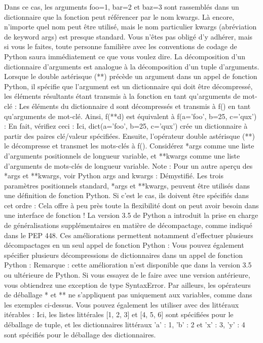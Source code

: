 Dans ce cas, les arguments foo=1, bar=2 et baz=3 sont rassemblés dans un dictionnaire que la fonction peut référencer par le nom kwargs.  Là encore, n'importe quel nom peut être utilisé, mais le nom particulier kwargs (abréviation de keyword args) est presque standard.  Vous n'êtes pas obligé d'y adhérer, mais si vous le faites, toute personne familière avec les conventions de codage de Python saura immédiatement ce que vous voulez dire.
La décomposition d'un dictionnaire d'arguments est analogue à la décomposition d'un tuple d'arguments.  Lorsque le double astérisque (**) précède un argument dans un appel de fonction Python, il spécifie que l'argument est un dictionnaire qui doit être décompressé, les éléments résultants étant transmis à la fonction en tant qu'arguments de mot-clé :
Les éléments du dictionnaire d sont décompressés et transmis à f() en tant qu'arguments de mot-clé.  Ainsi, f(**d) est équivalent à f(a='foo', b=25, c='qux') :
En fait, vérifiez ceci :
Ici, dict(a='foo', b=25, c='qux') crée un dictionnaire à partir des paires clé/valeur spécifiées.  Ensuite, l'opérateur double astérisque (**) le décompresse et transmet les mots-clés à f().
Considérez *args comme une liste d'arguments positionnels de longueur variable, et **kwargs comme une liste d'arguments de mots-clés de longueur variable.
Note : Pour un autre aperçu des *args et **kwargs, voir Python args and kwargs : Démystifié.
Les trois paramètres positionnels standard, *args et **kwargs, peuvent être utilisés dans une définition de fonction Python. Si c'est le cas, ils doivent être spécifiés dans cet ordre :
Cela offre à peu près toute la flexibilité dont on peut avoir besoin dans une interface de fonction !
La version 3.5 de Python a introduit la prise en charge de généralisations supplémentaires en matière de décompactage, comme indiqué dans le PEP 448.  Ces améliorations permettent notamment d'effectuer plusieurs décompactages en un seul appel de fonction Python :
Vous pouvez également spécifier plusieurs décompressions de dictionnaires dans un appel de fonction Python :
Remarque : cette amélioration n'est disponible que dans la version 3.5 ou ultérieure de Python.  Si vous essayez de le faire avec une version antérieure, vous obtiendrez une exception de type SyntaxError.
Par ailleurs, les opérateurs de déballage * et ** ne s'appliquent pas uniquement aux variables, comme dans les exemples ci-dessus.  Vous pouvez également les utiliser avec des littéraux itérables :
Ici, les listes littérales [1, 2, 3] et [4, 5, 6] sont spécifiées pour le déballage de tuple, et les dictionnaires littéraux {'a' : 1, 'b' : 2} et {'x' : 3, 'y' : 4} sont spécifiés pour le déballage des dictionnaires.
